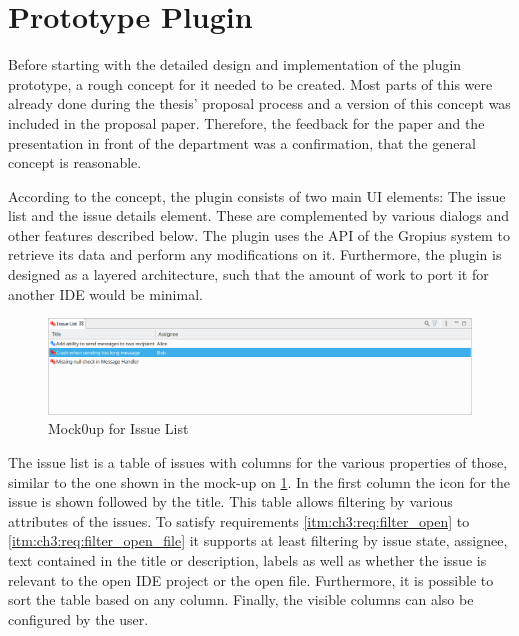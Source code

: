 \section{Prototype Plugin}
\label{sec:ch3:s3}
Before starting with the detailed design and implementation of the plugin prototype, a rough concept for it needed to be created.
Most parts of this were already done during the thesis' proposal process and a version of this concept was included in the proposal paper.
Therefore, the feedback for the paper and the presentation in front of the department was a confirmation, that the general concept is reasonable.

According to the concept, the plugin consists of two main \gls{UI} elements: The issue list and the issue details element.
These are complemented by various dialogs and other features described below.
The plugin uses the \gls{API} of the Gropius system \cite{speth2020gropius} to retrieve its data and perform any modifications on it.
Furthermore, the plugin is designed as a layered architecture, such that the amount of work to port it for another \gls{IDE} would be minimal.

\begin{figure}[!h]
	\centering
	\includegraphics[width=\textwidth]{graphics/concept_mockup_issueList.png}
	\caption{Mock0up for Issue List}
	\label{fig:c3:mockup_issueList}
\end{figure}
The issue list is a table of issues with columns for the various properties of those, 
similar to the one shown in the mock-up on \cref{fig:c3:mockup_issueList}.
In the first column the icon for the issue is shown followed by the title.
This table allows filtering by various attributes of the issues.
To satisfy requirements \ref{itm:ch3:req:filter_open} to \ref{itm:ch3:req:filter_open_file} it supports at least filtering
by issue state, assignee, text contained in the title or description, 
labels as well as whether the issue is relevant to the open \gls{IDE} project or the open file.
Furthermore, it is possible to sort the table based on any column. 
Finally, the visible columns can also be configured by the user.

